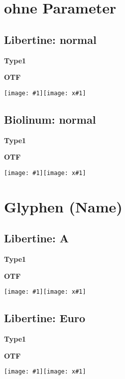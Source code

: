 \documentclass[ngerman,a4paper,10pt]{article}
\newcommand*\bsp[1]{%
\begin{minipage}{\linewidth}
\begin{minipage}{.46\linewidth}\centering\textbf{Type1}\end{minipage}\hfill
\begin{minipage}{.46\linewidth}\centering\textbf{OTF}\end{minipage}\par
\texttt{[image: \#1]}\hfill\texttt{[image: x\#1]}
\end{minipage}}
\begin{document}
\section{ohne Parameter}
\subsection{Libertine: normal}\bsp{bsp01}
\subsection{Biolinum: normal}\bsp{bsp02}


\section{Glyphen (Name)}
\subsection{Libertine: A}\bsp{bspg03}

\subsection{Libertine: Euro}\bsp{bspg01}
\end{document}
